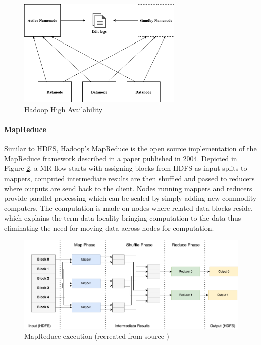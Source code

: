 \documentclass[review]{elsarticle}
\begin{document}
\begin{figure}[h!]
	\centering
	\includegraphics[width=0.7\textwidth]{HadoopHA}
	\caption{Hadoop High Availability}
	\label{fig:HadoopHA}
\end{figure}

\paragraph{MapReduce} 
Similar to HDFS, Hadoop's MapReduce is the open source implementation of the MapReduce framework described in a paper \cite{dean_mapreduce_2004} published in 2004. Depicted in Figure \ref{fig:MapReduce}, a MR flow starts with assigning blocks from HDFS as input splits to mappers, computed intermediate results are then shuffled and passed to reducers where outputs are send back to the client. Nodes running mappers and reducers provide parallel processing which can be scaled by simply adding new commodity computers. The computation is made on nodes where related data blocks reside, which explains the term data locality bringing computation to the data thus eliminating the need for moving data across nodes for computation.

\begin{figure}[h!]
	\includegraphics[width=\textwidth]{MapReduce}
	\caption{MapReduce execution (recreated from source \cite{schatzle_giant_nodate})}
	\label{fig:MapReduce}
	\centering
\end{figure}
\end{document}
